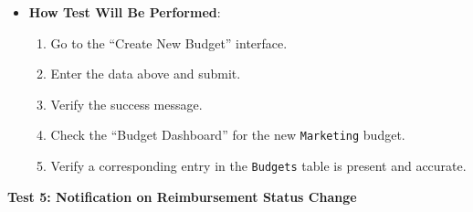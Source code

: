 \documentclass[12pt, titlepage]{article}
\begin{document}
\begin{itemize}
    \item \textbf{How Test Will Be Performed}:
    \begin{enumerate}
        \item Go to the ``Create New Budget'' interface.
        \item Enter the data above and submit.
        \item Verify the success message.
        \item Check the ``Budget Dashboard'' for the new \texttt{Marketing} budget.
        \item Verify a corresponding entry in the \texttt{Budgets} table is present and accurate.
    \end{enumerate}
\end{itemize}


\textbf{Test 5: Notification on Reimbursement Status Change}
\end{document}

